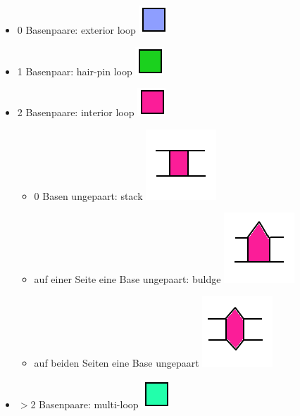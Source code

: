 \begin{itemize}
	\item 0 Basenpaare: exterior loop
	\includegraphics[scale=0.4]{lectures/160404_2/pix/turner0}
	\item 1 Basenpaar: hair-pin loop
	\includegraphics[scale=0.4]{lectures/160404_2/pix/turner1}
	\item 2 Basenpaare: interior loop
	\includegraphics[scale=0.4]{lectures/160404_2/pix/turner2}
	
	\begin{itemize}
	\item 0 Basen ungepaart: stack
	\includegraphics[scale=0.3]{lectures/160404_2/pix/stack}
	\item auf einer Seite eine Base ungepaart: buldge
	\includegraphics[scale=0.3]{lectures/160404_2/pix/buldge1}
	\item auf beiden Seiten eine Base ungepaart
	\includegraphics[scale=0.3]{lectures/160404_2/pix/buldge2}
	\end{itemize}
	
	\item $>$2 Basenpaare:  multi-loop
	\includegraphics[scale=0.4]{lectures/160404_2/pix/turner3}
\end{itemize}

